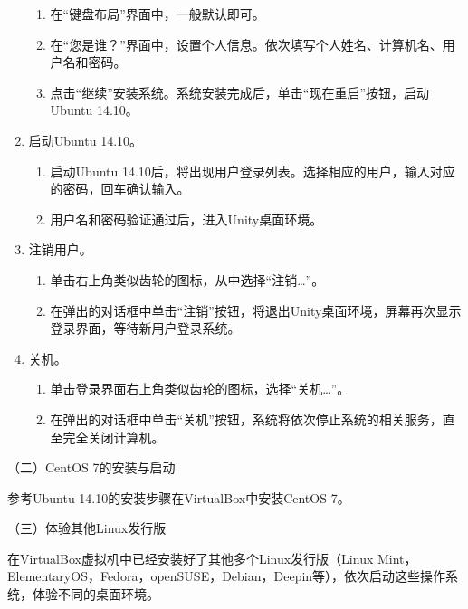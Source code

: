 \begin{enumerate}
\begin{enumerate}
      \item 在“键盘布局”界面中，一般默认即可。
      \item 在“您是谁？”界面中，设置个人信息。依次填写个人姓名、计算机名、用户名和密码。
      \item 点击“继续”安装系统。系统安装完成后，单击“现在重启”按钮，启动Ubuntu 14.10。
    \end{enumerate}
  \item 启动Ubuntu 14.10。
    \begin{enumerate}
      \item 启动Ubuntu 14.10后，将出现用户登录列表。选择相应的用户，输入对应的密码，回车确认输入。
      \item 用户名和密码验证通过后，进入Unity桌面环境。
    \end{enumerate}
  \item 注销用户。
    \begin{enumerate}
      \item 单击右上角类似齿轮的图标，从中选择“注销…”。
      \item 在弹出的对话框中单击“注销”按钮，将退出Unity桌面环境，屏幕再次显示登录界面，等待新用户登录系统。
    \end{enumerate}
  \item 关机。
    \begin{enumerate}
      \item 单击登录界面右上角类似齿轮的图标，选择“关机…”。
      \item 在弹出的对话框中单击“关机”按钮，系统将依次停止系统的相关服务，直至完全关闭计算机。
    \end{enumerate}
\end{enumerate}

\vspace{0.1in}
（二）CentOS 7的安装与启动

参考Ubuntu 14.10的安装步骤在VirtualBox中安装CentOS 7。

\vspace{0.1in}
（三）体验其他Linux发行版

在VirtualBox虚拟机中已经安装好了其他多个Linux发行版（Linux Mint，ElementaryOS，Fedora，openSUSE，Debian，Deepin等），依次启动这些操作系统，体验不同的桌面环境。
